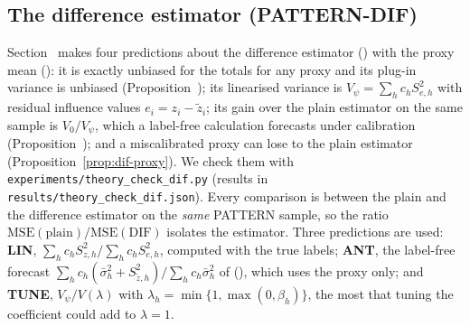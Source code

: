 \subsection{The difference estimator (PATTERN-DIF)}\label{sec:sim-dif}

Section~ makes four predictions about the difference estimator () with the proxy mean (): it is exactly unbiased for the totals
for any proxy and its plug-in variance is unbiased (Proposition~); its linearised variance is $V_\psi=\sum_hc_hS^2_{e,h}$ with residual influence values
$e_i=z_i-\tilde z_i$; its gain over the plain estimator on the same sample is $V_0/V_\psi$, which a label-free calculation forecasts under calibration
(Proposition~); and a miscalibrated proxy can lose to the plain estimator (Proposition~\ref{prop:dif-proxy}). We check them with
\texttt{experiments/theory\_check\_dif.py} (results in \texttt{results/theory\_check\_dif.json}). Every comparison is between the plain and the
difference estimator on the \emph{same} PATTERN sample, so the ratio $\mathrm{MSE}(\text{plain})/\mathrm{MSE}(\text{DIF})$ isolates the estimator. Three predictions are used:
\textbf{LIN}, $\sum_hc_hS^2_{z,h}/\sum_hc_hS^2_{e,h}$, computed with the true labels; \textbf{ANT}, the label-free forecast
$\sum_hc_h(\bar\sigma^2_h+S^2_{\tilde z,h})/\sum_hc_h\bar\sigma^2_h$ of (), which uses the proxy only; and \textbf{TUNE}, $V_\psi/V(\lambda)$ with $\lambda_h=\min\{1,\max(0,\beta_h)\}$, the
most that tuning the coefficient could add to $\lambda=1$.


